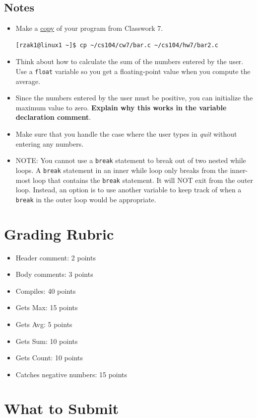 \documentclass[letter,11pt]{article}
\begin{document}
\subsection*{Notes}
\begin{itemize}
    \item Make a \underline{copy} of your program from Classwork 7.
    \begin{verbatim}
[rzak1@linux1 ~]$ cp ~/cs104/cw7/bar.c ~/cs104/hw7/bar2.c
    \end{verbatim}
    \item Think about how to calculate the sum of the numbers entered by the user. Use a \texttt{float} variable so you get a floating-point value when you compute the average.
    \item Since the numbers entered by the user must be positive, you can initialize the maximum value to zero. \textbf{Explain why this works in the variable declaration comment}.
    \item Make sure that you handle the case where the user types in \textit{quit} without entering any numbers.
    \item NOTE: You cannot use a \texttt{break} statement to break out of two nested while loops. A \texttt{break} statement in an inner while loop only breaks from the inner-most loop that contains the \texttt{break} statement. It will NOT exit from the outer loop. Instead, an option is to use another variable to keep track of when a \texttt{break} in the outer loop would be appropriate.
\end{itemize}

\section*{Grading Rubric}
\begin{itemize}
    \item Header comment: 2 points
    \item Body comments: 3 points
    \item Compiles: 40 points
    \item Gets Max: 15 points
    \item Gets Avg: 5 points
    \item Gets Sum: 10 points
    \item Gets Count: 10 points
    \item Catches negative numbers: 15 points
\end{itemize}

\section*{What to Submit}
\end{document}
